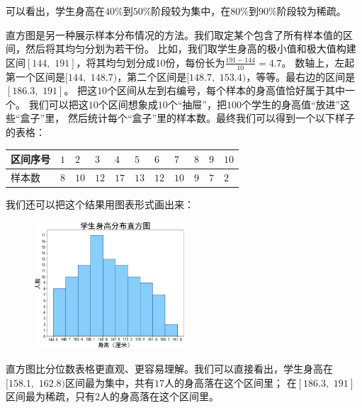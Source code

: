 \documentclass[12pt,UTF8]{ctexbook}
\begin{document}
可以看出，学生身高在$40\%$到$50\%$阶段较为集中，在$80\%$到$90\%$阶段较为稀疏。


直方图是另一种展示样本分布情况的方法。我们取定某个包含了所有样本值的区间，然后将其均匀分划为若干份。
比如，我们取学生身高的极小值和极大值构建区间$[144, \,\,191]$，将其均匀划分成$10$份，每份长为$\frac{191-144}{10}=4.7$。
数轴上，左起第一个区间是$[144, \,\,148.7)$，第二个区间是$[148.7, \,\,153.4)$，等等。最右边的区间是$[186.3, \,\, 191]$。
把这$10$个区间从左到右编号，每个样本的身高值恰好属于其中一个。
我们可以把这$10$个区间想象成$10$个“抽屉”，把$100$个学生的身高值“放进”这些“盒子”里，
然后统计每个“盒子”里的样本数。最终我们可以得到一个以下样子的表格：
\begin{center}
    \begin{tabular}{ | p{4em}<{\centering} | p{1.7em}<{\centering} | p{1.7em}<{\centering} | p{1.7em}<{\centering} | p{1.7em}<{\centering} | p{1.7em}<{\centering} | p{1.7em}<{\centering} | p{1.7em}<{\centering} | p{1.7em}<{\centering} | p{1.7em}<{\centering} | p{1.7em}<{\centering} | }
        \hline
        区间序号 & $1$ & $2$  & $3$  & $4$  & $5$  & $6$  & $7$  & $8$ & $9$ & $10$ \\ [0.5ex] 
        \hline
        样本数   & $8$ & $10$ & $12$ & $17$ & $13$ & $12$ & $10$ & $9$ & $7$ & $2$  \\  
        \hline
    \end{tabular}
\end{center}
我们还可以把这个结果用图表形式画出来：

\begin{figure}[h] %
    \vspace{8pt}
    \centering
    \includegraphics[width=0.5\textwidth]{直方图1.png}
\end{figure}

直方图比分位数表格更直观、更容易理解。我们可以直接看出，学生身高在$[158.1, \,\, 162.8)$区间最为集中，共有$17$人的身高落在这个区间里；
在$[186.3, \,\, 191]$区间最为稀疏，只有$2$人的身高落在这个区间里。
\end{document}
